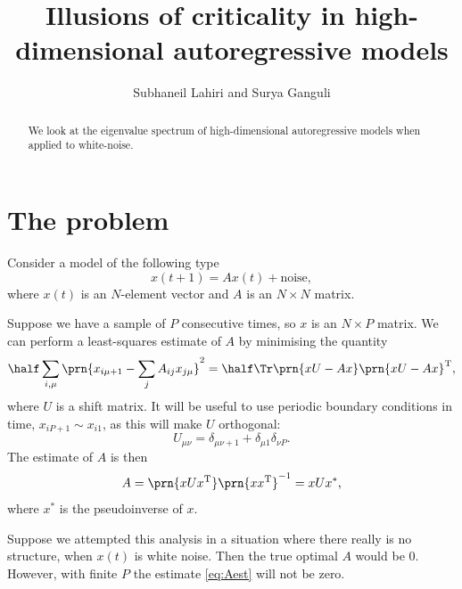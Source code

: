 \documentclass[12pt]{article}
\title{Illusions of criticality in high-dimensional autoregressive models}
\author{Subhaneil Lahiri and Surya Ganguli
%
}
\newcommand{\inv}{^{-1}}
\newcommand{\trans}{^\mathrm{T}}
\begin{document}
\maketitle




\begin{abstract}
  We look at the eigenvalue spectrum of high-dimensional autoregressive models when applied to white-noise.
\end{abstract}

\tableofcontents


\section{The problem}\label{sec:theprob}

Consider a model of the following type
%
\begin{equation}\label{eq:model}
  x(t+1) = A x(t) + \text{noise},
\end{equation}
%
where $x(t)$ is an $N$-element vector and $A$ is an $N\times N$ matrix.

Suppose we have a sample of $P$ consecutive times, so $x$ is an $N\times P$ matrix.
We can perform a least-squares estimate of $A$ by minimising the quantity
%
\begin{equation}\label{eq:minL}
  \half\sum_{i,\mu} \prn{ x_{i\mu+1} - \sum_j A_{ij} x_{j\mu} }^2 = \half\Tr \prn{xU-Ax}\prn{xU-Ax}\trans,
\end{equation}
%
where $U$ is a shift matrix.
It will be useful to use periodic boundary conditions in time, \ie $x_{iP+1}\sim x_{i1}$,
as this will make $U$ orthogonal:
%
\begin{equation}\label{eq:Udef}
  U_{\mu\nu} = \delta_{\mu\nu+1} + \delta_{\mu1}\delta_{\nu P}.
\end{equation}
%
The estimate of $A$ is then
%
\begin{equation}\label{eq:Aest}
  A = \prn{xUx\trans}\prn{xx\trans}\inv = xUx^*,
\end{equation}
%
where $x^*$ is the pseudoinverse of $x$.

Suppose we attempted this analysis in a situation where there really is no structure,
\ie when $x(t)$ is white noise.
Then the true optimal $A$ would be 0.
However, with finite $P$ the estimate \eqref{eq:Aest} will not be zero.
\end{document}
